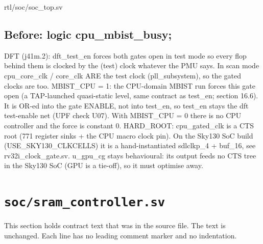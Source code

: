 \begin{relocated}{rtl/soc/soc_top.sv}

\subsection*{Before: logic cpu\_mbist\_busy;}

\begin{textblock}
DFT (j41m.2): dft_test_en forces both gates open in test mode so every flop
behind them is clocked by the (test) clock whatever the PMU says. In scan mode
cpu_core_clk / core_clk ARE the test clock (pll_subsystem), so the gated
clocks are too.
MBIST_CPU = 1: the CPU-domain MBIST run forces this gate open (a TAP-launched quasi-static level, same
contract as test_en; section 16.6). It is OR-ed into the gate ENABLE, not into test_en, so test_en stays the
dft test-enable net (UPF check U07). With MBIST_CPU = 0 there is no CPU controller and the force is constant 0.
HARD_ROOT: cpu_gated_clk is a CTS root (771 register sinks + the CPU macro clock pin). On the Sky130 SoC build
(USE_SKY130_CLKCELLS) it is a hand-instantiated sdlclkp_4 + buf_16, see rv32i_clock_gate.sv. u_gpu_cg stays
behavioural: its output feeds no CTS tree in the Sky130 SoC (GPU is a tie-off), so it must optimise away.
\end{textblock}

\end{relocated}

\section{\texttt{soc/sram\_controller.sv}}\label{ds:mod:sram-controller}

This section holds contract text that was in the source file. The text is unchanged. Each line has no leading comment marker and no indentation.

